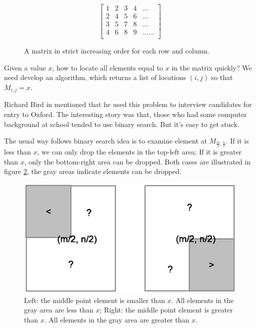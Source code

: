 \documentclass[UTF8]{article}
\begin{document}
\begin{figure}[htbp]
 \centering
\[
\left [
  \begin{array}{ccccc}
    1 & 2 & 3 & 4 & ... \\
    2 & 4 & 5 & 6 & ... \\
    3 & 5 & 7 & 8 & ... \\
    4 & 6 & 8 & 9 & ...
    ... \\
  \end{array}
\right ]
\]
\caption{A matrix in strict increasing order for each row and column.}
\label{fig:matrix-eg}
\end{figure}

Given a value $x$, how to locate all elements equal to $x$ in the matrix quickly? We need develop an algorithm,
which returns a list of locations $(i, j)$ so that $M_{i,j} = x$.

Richard Bird in \cite{fp-pearls} mentioned that he used this problem to interview candidates for entry to Oxford.
The interesting story was that, those who had some computer background at school tended to use binary search.
But it's easy to get stuck.

The usual way follows binary search idea is to examine element at $M_{\frac{m}{2}, \frac{n}{2}}$. If it is less than
$x$, we can only drop the elements in the top-left area; If it is greater than $x$, only the bottom-right area
can be dropped. Both cases are illustrated in figure \ref{fig:bsearch-2D}, the gray areas indicate elements can be dropped.

\begin{figure}[htbp]
 \centering
 \includegraphics[scale=0.5]{img/bsearch-2D.eps}
 \caption{Left: the middle point element is smaller than $x$. All elements in the gray area are less than $x$; Right: the middle point element is greater than $x$. All elements in the gray area are greater than $x$.}
 \label{fig:bsearch-2D}
\end{figure}
\end{document}
